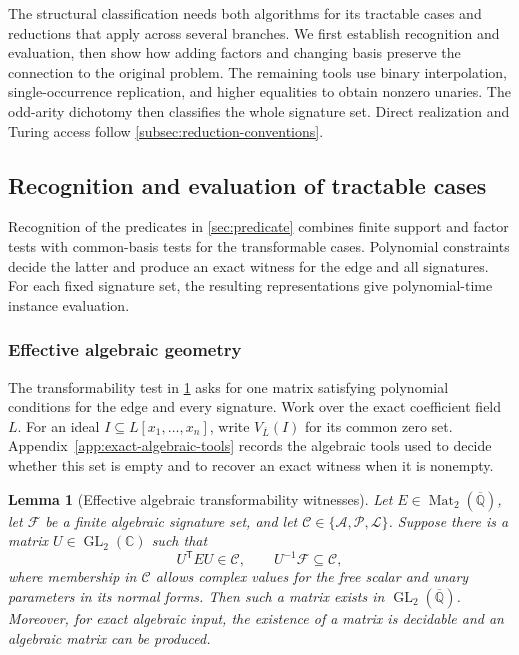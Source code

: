 \documentclass[11pt,letterpaper,onecolumn]{article}
\theoremstyle{plain}
\newtheorem{lemma}[lemma]{Lemma}
\theoremstyle{definition}
\theoremstyle{remark}
\newcommand{\AlgNums}{\overline{\mathbb Q}}
\newcommand{\cF}{\mathcal F}
\newcommand{\cA}{\mathscr A}
\newcommand{\cP}{\mathscr P}
\newcommand{\cL}{\mathscr L}
\newcommand{\cC}{\mathscr C}
\newcommand{\GL}{\operatorname{GL}}
\newcommand{\Mat}{\operatorname{Mat}}
\begin{document}
The structural classification needs both algorithms for its tractable cases
and reductions that apply across several branches. We first establish
recognition and evaluation, then show how adding factors and changing basis
preserve the connection to the original problem. The remaining tools use
binary interpolation, single-occurrence replication, and higher equalities
to obtain nonzero unaries. The odd-arity dichotomy then classifies the whole
signature set. Direct realization and Turing access follow
\cref{subsec:reduction-conventions}.

\subsection{Recognition and evaluation of tractable cases}
\label{subsec:shared-recognition}

Recognition of the predicates in \cref{sec:predicate} combines finite
support and factor tests with common-basis tests for the transformable
cases. Polynomial constraints decide the latter and produce an exact
witness for the edge and all signatures. For each fixed signature set,
the resulting representations give polynomial-time instance evaluation.

\subsubsection{Effective algebraic geometry}
\label{subsubsec:effective-algebraic-geometry}

The transformability test in \cref{lem:algebraic-transform-witness} asks
for one matrix satisfying polynomial conditions for the edge and every
signature. Work over the exact coefficient field \(L\). For an ideal
\(I\subseteq L[x_1,\ldots,x_n]\), write \(V_{\overline L}(I)\) for its
common zero set. Appendix~\ref{app:exact-algebraic-tools} records the
algebraic tools used to decide whether this set is empty and to recover
an exact witness when it is nonempty.

\begin{lemma}[Effective algebraic transformability witnesses]
\label{lem:algebraic-transform-witness}
Let \(E\in\Mat_2(\AlgNums)\), let \(\cF\) be a finite algebraic
signature set, and let \(\cC\in\{\cA,\cP,\cL\}\).  Suppose there is a matrix
\(U\in\GL_2(\mathbb C)\) such that
\[
  U^{\mathsf T}EU\in\cC,
  \qquad
  U^{-1}\cF\subseteq\cC,
\]
where membership in \(\cC\) allows complex values for the free scalar and
unary parameters in its normal forms.  Then such a matrix exists in
\(\GL_2(\AlgNums)\).  Moreover, for exact algebraic input, the existence of a
matrix is decidable and an algebraic matrix can be produced.
\end{lemma}
\end{document}
